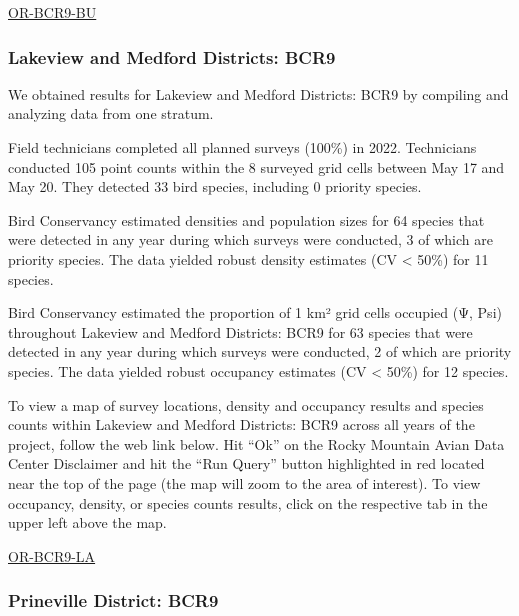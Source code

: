 \documentclass[
  letterpaper,
  DIV=11,
  numbers=noendperiod,
  oneside]{scrreprt}
\begin{document}
\href{http://www.rmbo.org/new_site/adc/QueryWindow.aspx\#N4IgzgLgTghhCuBbEAuABCA8gJQLQCEBhbATgIFV194oBTGeNAewDM0AZGAOwBM0BZbjADmtRLS4Q0uNNShcwaACIBLSFBUBjCCAC+QA}{OR-BCR9-BU}

\hypertarget{lakeview-and-medford-districts-bcr9}{%
\subsubsection{Lakeview and Medford Districts:
BCR9}\label{lakeview-and-medford-districts-bcr9}}

We obtained results for Lakeview and Medford Districts: BCR9 by
compiling and analyzing data from one stratum.

Field technicians completed all planned surveys (100\%) in 2022.
Technicians conducted 105 point counts within the 8 surveyed grid cells
between May 17 and May 20. They detected 33 bird species, including 0
priority species.

Bird Conservancy estimated densities and population sizes for 64 species
that were detected in any year during which surveys were conducted, 3 of
which are priority species. The data yielded robust density estimates
(CV \textless{} 50\%) for 11 species.

Bird Conservancy estimated the proportion of 1 km² grid cells occupied
(Ψ, Psi) throughout Lakeview and Medford Districts: BCR9 for 63 species
that were detected in any year during which surveys were conducted, 2 of
which are priority species. The data yielded robust occupancy estimates
(CV \textless{} 50\%) for 12 species.

To view a map of survey locations, density and occupancy results and
species counts within Lakeview and Medford Districts: BCR9 across all
years of the project, follow the web link below. Hit ``Ok'' on the Rocky
Mountain Avian Data Center Disclaimer and hit the ``Run Query'' button
highlighted in red located near the top of the page (the map will zoom
to the area of interest). To view occupancy, density, or species counts
results, click on the respective tab in the upper left above the map.

\href{http://www.rmbo.org/new_site/adc/QueryWindow.aspx\#N4IgzgLgTghhCuBbEAuABCA8gJQLQCEBhbATlwBkBBdfeKAUxnjQHsAzNcmAOwBM0AsjxgBzeonrcIaXJxgBregDcAlvQDuaHvwH1ebFlH4ARFZCgqAxhDAgAvkA}{OR-BCR9-LA}

\hypertarget{prineville-district-bcr9}{%
\subsubsection{Prineville District:
BCR9}\label{prineville-district-bcr9}}
\end{document}
